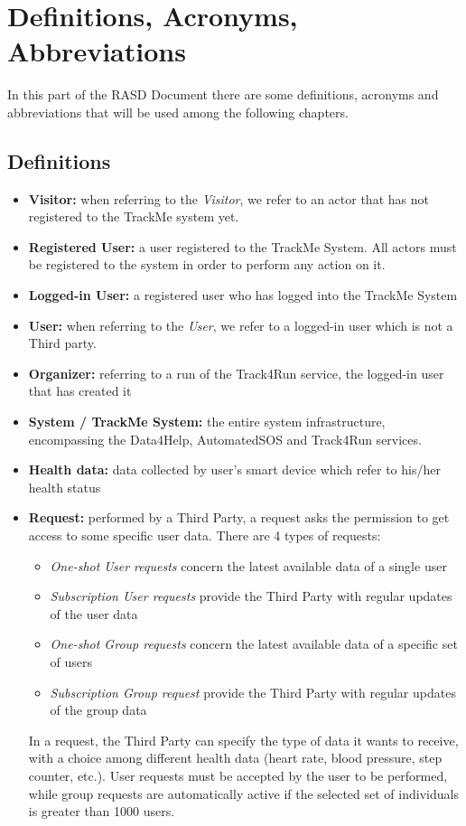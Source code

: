 \section{Definitions, Acronyms, Abbreviations}
In this part of the RASD Document there are some definitions, acronyms and abbreviations that will be used among the following chapters.
\subsection{Definitions}

\begin{itemize}

\item \textbf{Visitor:} when referring to the \emph{Visitor}, we refer to an actor that has not registered to the TrackMe system yet.

\item \textbf{Registered User:} a user registered to the TrackMe System. All actors must be registered to the system in order to perform any action on it.

\item\textbf{Logged-in User:} a registered user who has logged into the TrackMe System

\item \textbf{User:} when referring to the \emph{User}, we refer to a logged-in user which is not a Third party. 

\item\textbf{Organizer:} referring to a run of the Track4Run service, the logged-in user that has created it

\item \textbf{System / TrackMe System:} the entire system infrastructure, encompassing the Data4Help, AutomatedSOS and Track4Run services.

\item\textbf{Health data:} data collected by user's smart device which refer to his/her health status

\item\textbf{Request:} performed by a Third Party, a request asks the permission to get access to some specific user data.
There are 4 types of requests: 
\begin{itemize}
\item \textit{One-shot User requests} concern the latest available data of a single user
\item \textit{Subscription User requests} provide the Third Party with regular updates of the user data
\item \textit{One-shot Group requests} concern the latest available data of a specific set of users
\item \textit{Subscription Group request} provide the Third Party with regular updates of the group data
\end{itemize}
In a request, the Third Party can specify the type of data it wants to receive, with a choice among different health data (heart rate, blood pressure, step counter, etc.). User requests must be accepted by the user to be performed, while group requests are automatically active if the selected set of individuals is greater than 1000 users.


\end{itemize}
